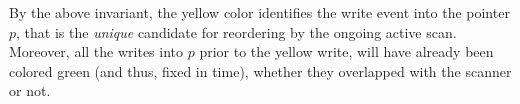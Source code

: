 By the above invariant, the yellow color identifies the write event
into the pointer $p$, that is the \emph{unique} candidate for
reordering by the ongoing active scan. Moreover, all the writes into
$p$ prior to the yellow write, will have already been colored green
(and thus, fixed in time), whether they overlapped with the scanner or
not.


\begin{comment}
\begin{proposition}[First Forwarding Principle]\label{inv:fwd1}%
If the scanner state is $\sss = \sOff\ \toff, \spp = \TT$, then
$\forall\ t \in \histp\ldot\ t \leq \E(t)< \toff \implies \C(t)=
\mathsf{green}$.
\end{proposition}
%
The above is our mathematical formulation approximating the
equally-named, but only informally stated property of
Jayanti~\cite{Jayanti:STOC05}, which says that if \jyscan~misses the
value of a concurrent write in lines~lineScanReadsY
and/or~\lineScanReadsY of Figure~\ref{fig:jayanti-snapshot}, but the
write finishes before the scanner goes through line~\lineScanUnsetsS
(the scan's linearization point), then the scanner will catch the
value in by reading from the forwarding pointer in
lines~\lineScanReadsFX and/or \lineScanReadsFY. In our setting, this
is captured by saying that a write event that finished before $\toff$,
is green. The write event may have been yellow in the past, but the
act of forwarding will paint it green. We will see in
Section~\ref{sc:implementation} that auxiliary code for forwarding
will do just that.


Conversely, Jayanti's Second Principle states that any non-$\bot$
value read in lines~\lineScanReadsX and/or~\lineScanReadsY comes from
a write event that is concurrent with the scan. Moreover, any later
write to the same pointer will finish after the linearization point of
\jyscan~in line~\lineScanUnsetsS, and hence will be missed by the
scanner. While we do not formally capture exactly this property, we
approximate it with the following two invariants, which are
sufficient.

\end{comment}

